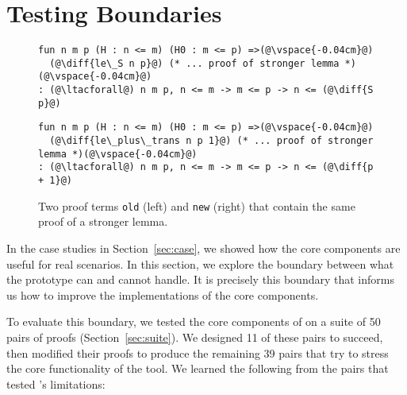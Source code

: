 \section{Testing Boundaries}
\label{sec:eval}

\begin{figure*}[ht]
\begin{minipage}{0.48\textwidth}
\begin{lstlisting}[language=coq]
fun n m p (H : n <= m) (H0 : m <= p) =>(@\vspace{-0.04cm}@)
  (@\diff{le\_S n p}@) (* ... proof of stronger lemma *)(@\vspace{-0.04cm}@)
: (@\ltacforall@) n m p, n <= m -> m <= p -> n <= (@\diff{S p}@)
\end{lstlisting}
\end{minipage}
\hfill
\begin{minipage}{0.48\textwidth}
\begin{lstlisting}[language=coq]
fun n m p (H : n <= m) (H0 : m <= p) =>(@\vspace{-0.04cm}@)
  (@\diff{le\_plus\_trans n p 1}@) (* ... proof of stronger lemma *)(@\vspace{-0.04cm}@)
: (@\ltacforall@) n m p, n <= m -> m <= p -> n <= (@\diff{p + 1}@)
\end{lstlisting}
\end{minipage}
\vspace{-.35cm}
\caption{Two proof terms \lstinline{old} (left) and \lstinline{new} (right) that contain the same proof of a stronger lemma.}
\label{fig:stronger}
\end{figure*}

\lstset{language=coq, aboveskip=3pt,belowskip=3pt}

In the case studies in Section~\ref{sec:case}, we showed how
the core components are useful for real scenarios.
In this section, we explore the boundary between what the \sysname prototype can and cannot handle.
It is precisely this boundary that informs us how to improve the implementations of the
core components.

To evaluate this boundary, we tested the core components of \sysname on a suite of 50 pairs of proofs (Section~\ref{sec:suite}).
We designed 11 of these pairs to succeed, then modified their proofs to produce the remaining 39 pairs
that try to stress the core functionality of the tool.
We learned the following from the pairs
that tested \sysname's limitations:

